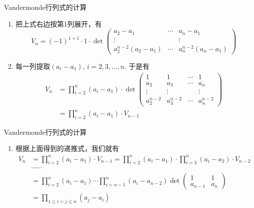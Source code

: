 \begin{frame}

\begin{block}{Vandermonde行列式的计算}
\begin{enumerate}
\addtocounter{enumi}{1}
\item<1-> 把上式右边{\color{red}按第1列展开}，有
\[
V_n = (-1)^{1+1} \cdot 1 \cdot \det \begin{pmatrix}
a_2-a_1 & \cdots & a_n-a_1 \\
\vdots & & \vdots \\
a_2^{n-2}(a_2-a_1) & \cdots & a_n^{n-2}(a_n-a_1)
\end{pmatrix}
\]
\item<2-> 每一列提取$(a_i-a_1)$, $i=2,3,\ldots,n$. 于是有
\[
\begin{aligned}
V_n & = \prod\limits_{i=2}^n (a_i-a_1) \cdot \det \begin{pmatrix}
1 & 1 & \cdots & 1 \\
a_2 & a_3 & \cdots & a_n \\
\vdots & \vdots & & \vdots \\
a_2^{n-2} & a_3^{n-2} & \cdots & a_n^{n-2}
\end{pmatrix} \\
& = \prod\limits_{i=2}^n (a_i-a_1) \cdot V_{n-1}
\end{aligned}
\]
\end{enumerate}
\end{block}

\end{frame}


\begin{frame}

\begin{block}{Vandermonde行列式的计算}
\begin{enumerate}
\addtocounter{enumi}{3}
\item 根据上面得到的递推式，我们就有
\begin{align*}
V_n & = \prod\limits_{i=2}^n (a_i-a_1) \cdot V_{n-1} = \prod\limits_{i=2}^n (a_i-a_1) \cdot \prod\limits_{i=3}^n (a_i-a_2) \cdot V_{n-2} \\
 & \cdots\cdots \\
 & = \prod\limits_{i=2}^n (a_i-a_1) \cdots \prod\limits_{i=n-1}^n (a_i-a_{n-2}) \det \begin{pmatrix} 1 & 1 \\ a_{n-1} & a_n \end{pmatrix} \\
 & = \prod\limits_{1\leqslant i < j \leqslant n} (a_j-a_i)
\end{align*}
\end{enumerate}
\end{block}

\end{frame}

